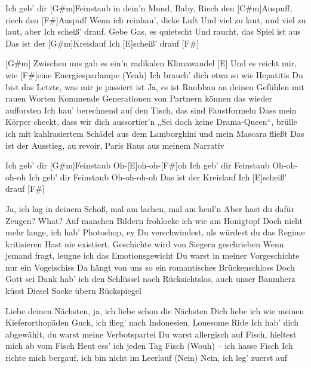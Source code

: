 

\begin{guitar}
	Ich geb' dir [G#m]Feinstaub in dein'n Mund, Baby, 
	Riech den [C#m]Auspuff, riech den [F#]Auspuff
	Wenn ich reinhau', dicke Luft 
	Und viel zu laut, und viel zu laut, aber 
	Ich scheiß' drauf. Gebe Gas, es quietscht
	Und raucht, das Spiel ist aus
	Das ist der [G#m]Kreislauf
	Ich [E]scheiß' drauf [F#]{}
	
	[G#m] Zwischen uns gab es ein'n radikalen Klimawandel
	[E] Und es reicht mir, wie [F#]eine Energiesparlampe
	(Yeah) Ich brauch' dich etwa so wie Hepatitis
	Du bist das Letzte, was mir je passiert ist
	Ja, es ist Raubbau an deinen Gefühlen mit rauen Worten
	Kommende Generationen von Partnern können das wieder aufforsten
	Ich hau' berechnend auf den Tisch, das sind Faustformeln
	Dass mein Körper checkt, dass wir dich aussortier'n
	„Sei doch keine Drama-Queen“, brülle ich mit kahlrasiertem
	Schädel aus dem Lamborghini und mein Mascara fließt
	Das ist der Ausstieg, au revoir, Paris
	Raus aus meinem Narrativ
	
	 

	Ich geb' dir [G#m]Feinstaub
	Oh-[E]oh-oh-[F#]oh
	Ich geb' dir Feinstaub
	Oh-oh-oh-oh
	Ich geb' dir Feinstaub
	Oh-oh-oh-oh
	Das ist der Kreislauf
	Ich [E]scheiß' drauf [F#]{}
	
	Ja, ich lag in deinem Schoß, mal am lachen, mal am heul'n
	Aber hast du dafür Zeugen?
	What? Auf manchen Bildern frohlocke ich wie am Honigtopf
	Doch nicht mehr lange, ich hab' Photoshop, ey
	Du verschwindest, als würdest du das Regime kritisieren
	Hast nie existiert, Geschichte wird von Siegern geschrieben
	Wenn jemand fragt, leugne ich das Emotionsgewicht
	Du warst in meiner Vorgeschichte nur ein Vogelschiss
	Da hängt von uns so ein romantisches Brückenschloss
	Doch Gott sei Dank hab' ich den Schlüssel noch
	Rücksichtslos, auch unser Baumherz küsst Diesel
	Socke übern Rückspiegel
	
	 
	
	 
	
	Liebe deinen Nächsten, ja, ich liebe schon die Nächsten
	Dich liebe ich wie meinen Kieferorthopäden
	Guck, ich flieg' nach Indonesien, Lonesome Ride
	Ich hab' dich abgewählt, du warst meine Verbotspartei
	Du warst allergisch auf Fisch, hieltest mich ab vom Fisch
	Heut ess' ich jeden Tag Fisch (Wouh) – ich hasse Fisch
	Ich richte mich bergauf, ich bin nicht im Leerlauf
	(Nein) Nein, ich leg' zuerst auf
	

\end{guitar}
